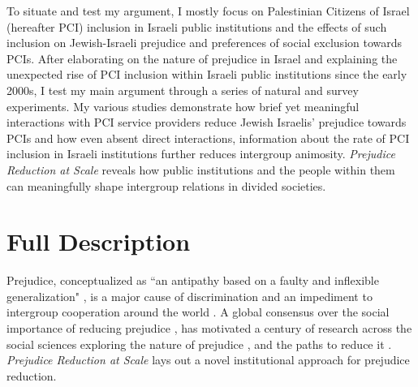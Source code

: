 \documentclass[12pt]{article}
\theoremstyle{plain}
\begin{document}
To situate and test my argument, I mostly focus on Palestinian Citizens of Israel (hereafter PCI) inclusion in Israeli public institutions and the effects of such inclusion on Jewish-Israeli prejudice and preferences of social exclusion towards PCIs. After elaborating on the nature of prejudice in Israel and explaining the unexpected rise of PCI inclusion within Israeli public institutions since the early 2000s, I test my main argument through a series of natural and survey experiments. My various studies demonstrate how brief yet meaningful interactions with PCI service providers reduce Jewish Israelis' prejudice towards PCIs and how even absent direct interactions, information about the rate of PCI inclusion in Israeli institutions further reduces intergroup animosity. \emph{Prejudice Reduction at Scale} reveals how public institutions and the people within them can meaningfully shape intergroup relations in divided societies. 


\section*{Full Description}
Prejudice, conceptualized as ``an antipathy based on a faulty and inflexible generalization" \citep[p. 9]{Allport1954}, is a major cause of discrimination and an impediment to intergroup cooperation around the world \citep{Enos:2018aa,Peyton:2021aa}. A global consensus over the social importance of reducing prejudice \citep{UNIES:2006tx}, has motivated a century of research across the social sciences exploring the nature of prejudice \citep{Allport1954,Fiske:1998aa}, and the paths to reduce it \citep{Paluck:2020aa}. \emph{Prejudice Reduction at Scale} lays out a novel institutional approach for prejudice reduction.





\end{document}
